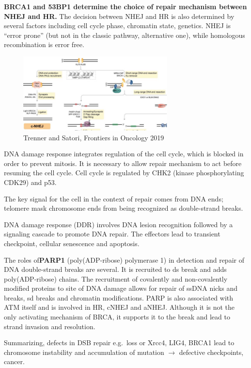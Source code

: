 \textbf{BRCA1 and 53BP1 determine the choice of repair mechanism between NHEJ
and HR.} The decision between NHEJ and HR is also determined by several factors including cell cycle phase, chromatin state, genetics. NHEJ is ``error prone'' (but not in the classic pathway, alternative one), while homologous recombination is error free.

\begin{figure}
\centering
\includegraphics[width=0.7\textwidth]{../_resources/Picture1.jpg}
\caption{Trenner and Satori, Frontiers in Oncology 2019}
\end{figure}

DNA damage response integrates regulation of the cell cycle, which is blocked in order to prevent mitosis. It is necessary to allow repair mechanism to act before resuming the cell cycle. Cell cycle is regulated by CHK2 (kinase phosphorylating CDK29) and p53.

The key signal for the cell in the context of repair comes from DNA ends; telomere mask chromosome ends from being recognized as double-strand breaks.

DNA damage response (DDR) involves DNA lesion recognition followed by a signaling cascade to promote DNA repair. The effectors lead to transient checkpoint, cellular senescence and apoptosis.

The roles of\textbf{PARP1} (poly(ADP-ribose) polymerase 1) in detection and repair of DNA double-strand breaks are several. It is recruited to ds break and adds poly(ADP-ribose) chains. The recruitment of covalently and non-covalently modified proteins to site of DNA damage allows for repair of ssDNA nicks and breaks, sd breaks and chromatin modifications. PARP is also associated with ATM itself and is involved in HR, cNHEJ and aNHEJ. Although it is not the only activating mechanism of BRCA, it supports it to the break and lead to strand invasion and resolution.

Summarizing, defects in DSB repair e.g.~loss or Xrcc4, LIG4, BRCA1 lead to chromosome instability and accumulation of mutation $\rightarrow$ defective checkpoints, cancer.

